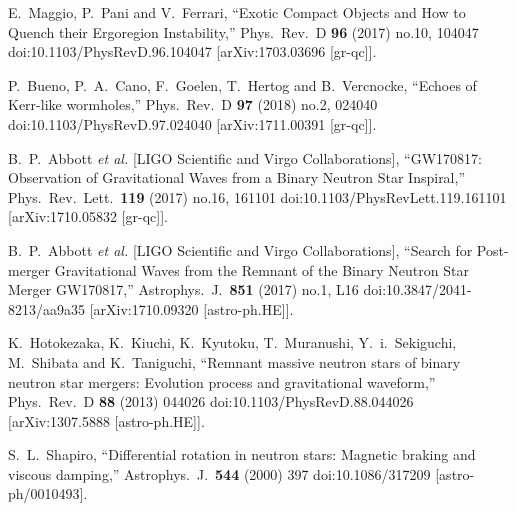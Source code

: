 \documentclass[a4paper,11pt]{article}
\begin{document}
\begin{thebibliography}{99}
  E.~Maggio, P.~Pani and V.~Ferrari,
  ``Exotic Compact Objects and How to Quench their Ergoregion Instability,''
  Phys.\ Rev.\ D {\bf 96} (2017) no.10,  104047
  doi:10.1103/PhysRevD.96.104047
  [arXiv:1703.03696 [gr-qc]].
  
  P.~Bueno, P.~A.~Cano, F.~Goelen, T.~Hertog and B.~Vercnocke,
  ``Echoes of Kerr-like wormholes,''
  Phys.\ Rev.\ D {\bf 97} (2018) no.2,  024040
  doi:10.1103/PhysRevD.97.024040
  [arXiv:1711.00391 [gr-qc]].

  B.~P.~Abbott {\it et al.} [LIGO Scientific and Virgo Collaborations],
  ``GW170817: Observation of Gravitational Waves from a Binary Neutron Star Inspiral,''
  Phys.\ Rev.\ Lett.\  {\bf 119} (2017) no.16,  161101
  doi:10.1103/PhysRevLett.119.161101
  [arXiv:1710.05832 [gr-qc]].
  
  B.~P.~Abbott {\it et al.} [LIGO Scientific and Virgo Collaborations],
  ``Search for Post-merger Gravitational Waves from the Remnant of the Binary Neutron Star Merger GW170817,''
  Astrophys.\ J.\  {\bf 851} (2017) no.1,  L16
  doi:10.3847/2041-8213/aa9a35
  [arXiv:1710.09320 [astro-ph.HE]].
  
  K.~Hotokezaka, K.~Kiuchi, K.~Kyutoku, T.~Muranushi, Y.~i.~Sekiguchi, M.~Shibata and K.~Taniguchi,
  ``Remnant massive neutron stars of binary neutron star mergers: Evolution process and gravitational waveform,''
  Phys.\ Rev.\ D {\bf 88} (2013) 044026
  doi:10.1103/PhysRevD.88.044026
  [arXiv:1307.5888 [astro-ph.HE]].
  
  S.~L.~Shapiro,
  ``Differential rotation in neutron stars: Magnetic braking and viscous damping,''
  Astrophys.\ J.\  {\bf 544} (2000) 397
  doi:10.1086/317209
  [astro-ph/0010493].


\end{thebibliography}
\end{document}
